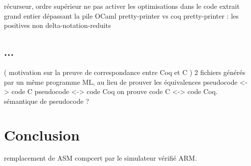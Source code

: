 \documentclass[a4paper, 11pt]{article}
\newcommand{\CCasm}{$_{\tt compcert}{\tt ASM}$\xspace}
\newcommand{\C}{$_{\tt compcert}{\tt C}$\xspace}
\begin{document}



récurseur, ordre supérieur
ne pas activer les optimisations dans le code extrait
grand entier dépassant la pile OCaml
pretty-printer vs coq pretty-printer : les positives non delta-notation-reduits
\subsection{...}
  ( motivation sur la preuve de correspondance entre Coq et C )
  2 fichiers générés par un même programme ML, au lieu de prouver les équivalences 
  pseudocode <-> code C
  pseudocode <-> code Coq
  on prouve code C <-> code Coq. sémantique de pseudocode ?

\section{Conclusion}
remplacement de ASM compcert par le simulateur vérifié ARM.
\end{document}
